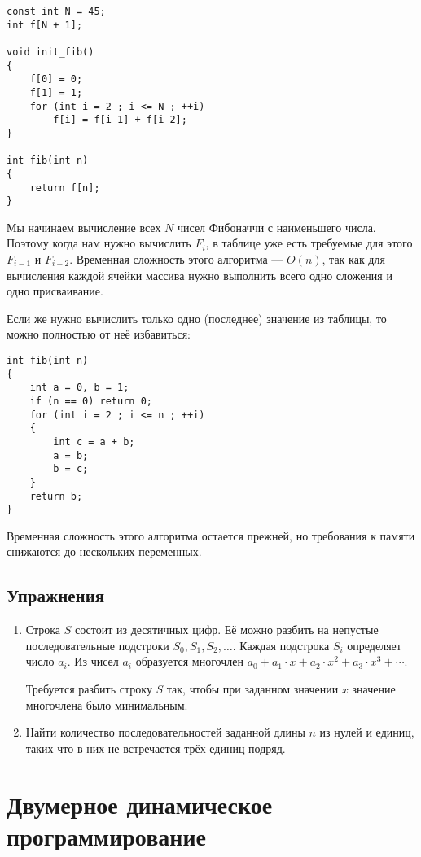 \documentclass[14pt,openany]{book}
\begin{document}
\begin{lstlisting}
const int N = 45;
int f[N + 1];

void init_fib()
{
    f[0] = 0;
    f[1] = 1;
    for (int i = 2 ; i <= N ; ++i)
        f[i] = f[i-1] + f[i-2];
}

int fib(int n)
{
    return f[n];
}
\end{lstlisting}

Мы начинаем вычисление всех $N$ чисел Фибоначчи с наименьшего числа. Поэтому когда нам
нужно вычислить $F_i$, в таблице уже есть требуемые для этого $F_{i-1}$ и $F_{i-2}$.
Временная сложность этого алгоритма --- $O(n)$, так как для вычисления каждой ячейки
массива нужно выполнить всего одно сложения и одно присваивание.

Если же нужно вычислить только одно (последнее) значение из таблицы, то можно полностью
от неё избавиться:

\begin{lstlisting}
int fib(int n)
{
    int a = 0, b = 1;
    if (n == 0) return 0;
    for (int i = 2 ; i <= n ; ++i)
    {
        int c = a + b;
        a = b;
        b = c;
    }
    return b;
}
\end{lstlisting}

Временная сложность этого алгоритма остается прежней, но требования к памяти снижаются
до нескольких переменных.

\section{Упражнения}

\begin{enumerate}

\item Строка $S$ состоит из десятичных цифр. Её можно разбить на непустые последовательные
      подстроки $S_0, S_1, S_2, \ldots$. Каждая подстрока $S_i$ определяет число $a_i$. Из чисел
      $a_i$ образуется многочлен $a_0 + a_1\cdot x + a_2\cdot x^2 + a_3\cdot x^3 + \cdots$.
      
      Требуется разбить строку $S$ так, чтобы при заданном значении $x$ значение многочлена
      было минимальным.

\item Найти количество последовательностей заданной длины $n$ из нулей и единиц, таких что в них
      не встречается трёх единиц подряд.

\end{enumerate}

\chapter{Двумерное динамическое программирование}
\end{document}
